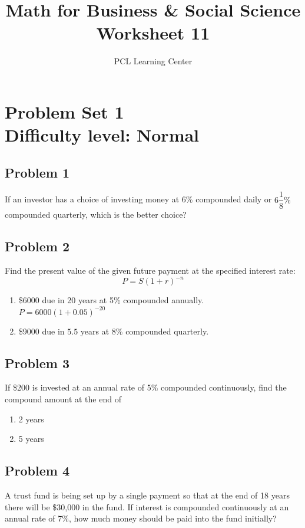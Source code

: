 \documentclass[12pt]{article}
\title{Math for Business \& Social Science\\ Worksheet 11}
\author{PCL Learning Center}
\date{}
\begin{document}
\maketitle

\section*{Problem Set 1\\Difficulty level: Normal}
\subsection*{Problem 1}
If an investor has a choice of investing money at 6\% compounded daily or \( 6 \dfrac{1}{8} \%\) compounded quarterly, which is the better choice?

\subsection*{Problem 2}
Find the present value of the given future payment at the specified interest rate:\\
\[
P = S(1 + r)^{-n}
\]
\begin{enumerate}[label=\alph*)]
    \item \$6000 due in 20 years at 5\% compounded annually.\\
    \( P = 6000(1 + 0.05)^{-20} \)
    \item \$9000 due in \(5.5\) years at 8\% compounded quarterly.
\end{enumerate}

\subsection*{Problem 3}
If \$200 is invested at an annual rate of 5\% compounded continuously, find the compound amount at the end of
\begin{enumerate}[label=\alph*)]
    \item 2 years
    \item 5 years
\end{enumerate}

\subsection*{Problem 4}
A trust fund is being set up by a single payment so that at the end of 18 years there will be \$30,000 in the fund. If interest is compounded continuously at an annual rate of 7\%, how much money should be paid into the fund initially?
\end{document}

